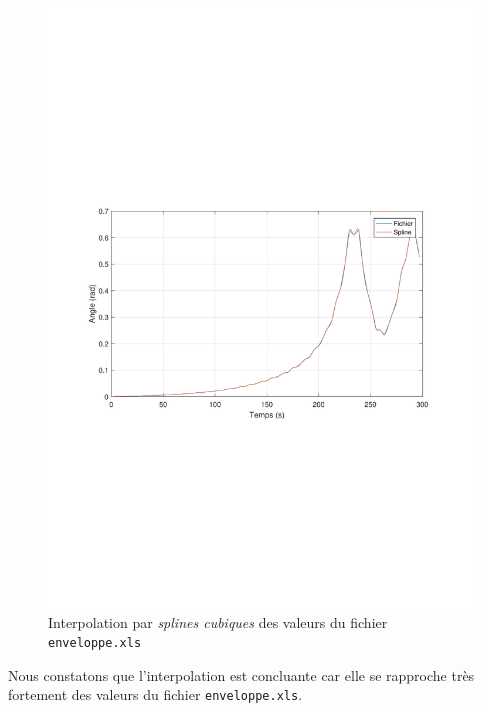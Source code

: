 \documentclass[a4paper, 12pt]{article}
\begin{document}
	\begin{figure}[H]
		\centering
		\includegraphics[width = \textwidth]{resources/pdf/Q1.pdf}
		\caption{Interpolation par \textit{splines cubiques} des valeurs du fichier \texttt{enveloppe.xls}}
	\end{figure}
	Nous constatons que l'interpolation est concluante car elle se rapproche très fortement des valeurs du fichier \texttt{enveloppe.xls}.
\end{document}
